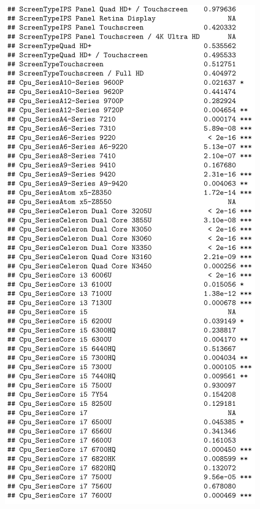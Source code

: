 \documentclass[12pt]{article}
\begin{document}
\begin{figure}[h!]
    \centering
    \includegraphics{Model_2_Sum(4_3).png}
    \label{fig:SUM24}
\end{figure}
\end{document}
